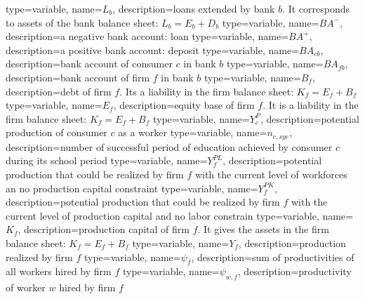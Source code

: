 {%
  type=variable,%
  name={$L_b$},%
  description={loans extended by bank $b$. It corresponds to assets of the bank balance sheet: $L_b=E_b+D_b$} 
}
{%
  type=variable,%
  name={$BA^-$},%
  description={a negative bank account: loan} 
}
{%
  type=variable,%
  name={$BA^+$},%
  description={a positive bank account: deposit} 
}
{%
  type=variable,%
  name={$BA_{cb}$},%
  description={bank account of consumer $c$ in bank $b$} 
}
{%
  type=variable,%
  name={$BA_{fb}$},%
  description={bank account of firm $f$ in bank $b$} 
}
{%
  type=variable,%
  name={$B_{f}$},%
  description={debt of firm $f$. Its a liability in the firm balance sheet: $K_f=E_f+B_f$} 
}
{%
  type=variable,%
  name={$E_{f}$},%
  description={equity base of firm $f$. It is a liability in the firm balance sheet: $K_f=E_f+B_f$} 
}
{%
  type=variable,%
  name={$Y^{P}_{c}$},%
  description={potential production of consumer $c$ as a worker} 
}
{%
  type=variable,%
  name={$n_{c,sye}$},%
  description={number of successful period of education achieved by consumer $c$ during its school period} 
}
{%
  type=variable,%
  name={$Y^{PL}_{f}$},%
  description={potential production that could be realized by firm $f$ with the current level of workforces an no production capital constraint} 
}
{%
  type=variable,%
  name={$Y^{PK}_{f}$},%
  description={potential production that could be realized by firm $f$ with the current level of production capital and no labor constrain} 
}
{%
  type=variable,%
  name={$K_{f}$},%
  description={production capital of firm $f$. It gives the assets in the firm balance sheet: $K_f=E_f+B_f$} 
}
{%
  type=variable,%
  name={$Y_{f}$},%
  description={production realized by firm $f$} 
}
{%
  type=variable,%
  name={$\psi_{f}$},%
  description={sum of productivities of all workers hired by firm $f$} 
}
{%
  type=variable,%
  name={$\psi_{w,f}$},%
  description={productivity of worker $w$ hired by firm $f$} 
}
